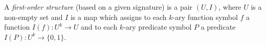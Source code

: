 

\setcounter{section}{1}
\setcounter{subsection}{4}
\setcounter{dfn}{11}

\begin{dfn}
A \emph{first-order structure} (based on a given signature) is a pair $(U, I)$, where
$U$ is a non-empty set and $I$ is a map which assigns to each $k$-ary function symbol $f$
a function $I(f) \colon U^k \to U$ and to each $k$-ary predicate symbol $P$ a predicate $I(P) \colon U^k \to \{0,1\}$.
\end{dfn}

